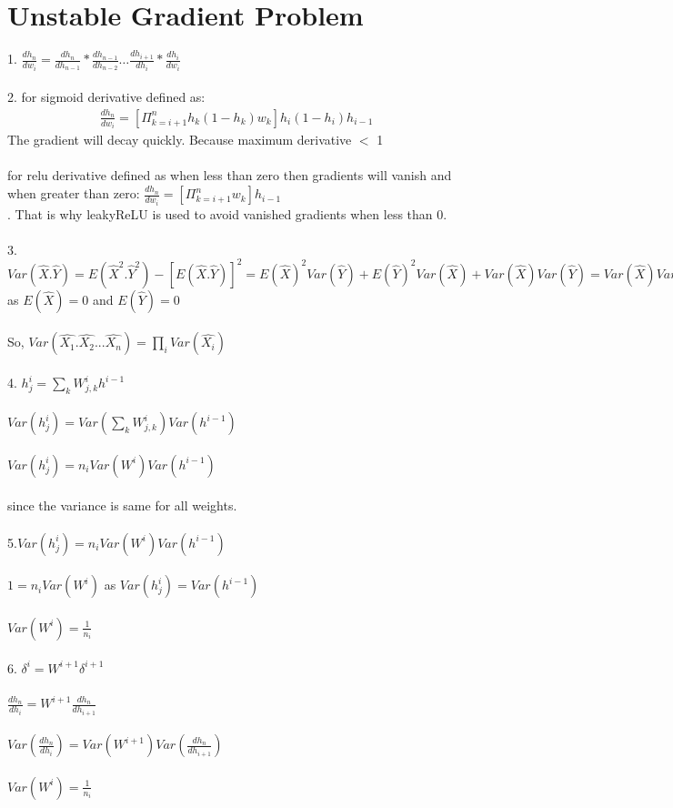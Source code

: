 \documentclass{article}
\begin{document}
\section{Unstable Gradient Problem}
1.
        $\frac{dh_n}{dw_i} = \frac{dh_n}{dh_{n-1}} * \frac{dh_{n-1}}{dh_{n-2}} \ldots  \frac{dh_{i+1}}{dh_{i}} * \frac{dh_i}{dw_i}$\\\\
2. for sigmoid derivative defined as: 
        \begin{align*}
            \frac{dh_n}{dw_i} = [\Pi_{k = i+1}^{n}  h_k (1 - h_k) w_k ] h_i (1 - h_i) h_{i-1}  
        \end{align*}
        The gradient will decay quickly. Because maximum derivative $<$ 1 \\\\
    for relu derivative defined as when less than zero then gradients will vanish and when greater than zero: $\frac{dh_n}{dw_i} = [\Pi_{k = i+1}^{n} w_k] h_{i-1}$\\. That is why leakyReLU is used to avoid vanished gradients when less than 0.\\
\\
3. $Var(\hat{X}.\hat{Y}) = E(\hat{X}^2.\hat{Y}^2) - [E(\hat{X}.\hat{Y})]^2 = E(\hat{X})^2Var(\hat{Y}) + E(\hat{Y})^2Var(\hat{X}) + Var(\hat{X})Var(\hat{Y}) = Var(\hat{X})Var(\hat{Y})$\\
as $E(\hat{X}) = 0$ and $E(\hat{Y}) = 0$\\
\\
So, $Var(\hat{X_1}.\hat{X_2}...\hat{X_n}) = \prod_i Var(\hat{X_i})$\\
\\
4. $h^{i}_{j} = \sum_k W^{i}_{j,k}h^{i-1}$\\\\
$Var(h^{i}_{j}) = Var(\sum_k W^{i}_{j,k})Var(h^{i-1})$\\\\
$Var(h^{i}_{j}) = n_i Var(W^{i})Var(h^{i-1})$\\\\
since the variance is same for all weights.\\
\\
5.$Var(h^{i}_{j}) = n_i Var(W^{i})Var(h^{i-1})$\\\\
$1 = n_i Var(W^{i})$ as $Var(h^{i}_{j}) = Var(h^{i-1})$\\\\
$Var(W^{i}) = \frac{1}{n_i} $\\\\
6. $\delta^{i} = W^{i+1}\delta^{i+1}$\\\\
$\frac{dh_n}{dh_i} = W^{i+1}\frac{dh_n}{dh_{i+1}}$\\\\
$Var(\frac{dh_n}{dh_i}) = Var(W^{i+1})Var(\frac{dh_n}{dh_{i+1}})$\\\\
$Var(W^{i}) = \frac{1}{n_i} $\\\\
\end{document}
